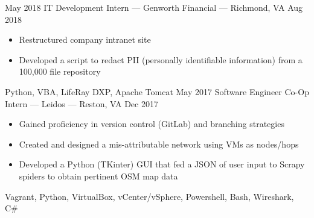 \begin{experiences}
	\experience
	{May 2018} {IT Development Intern --- Genworth Financial --- Richmond, VA}{}{}
	{Aug 2018} {
		\begin{itemize}
			\item Restructured company intranet site                          
			\item Developed a script to redact PII (personally identifiable information) from a 100,000 file repository                
		\end{itemize}
	}
	{Python, VBA, LifeRay DXP, Apache Tomcat}
	\emptySeparator
	\experience
	{May 2017} {Software Engineer Co-Op Intern --- Leidos --- Reston, VA}{}{}
	{Dec 2017} {
		\begin{itemize}
			\item Gained proficiency in version control (GitLab) and branching strategies 
			\item Created and designed a mis-attributable network using VMs as nodes/hops
			\item Developed a Python (TKinter) GUI that fed a JSON of user input to Scrapy spiders to obtain pertinent OSM map data                   
		\end{itemize}
	}
	{Vagrant, Python, VirtualBox, vCenter/vSphere, Powershell, Bash, Wireshark, C\#}
	\emptySeparator
\end{experiences}